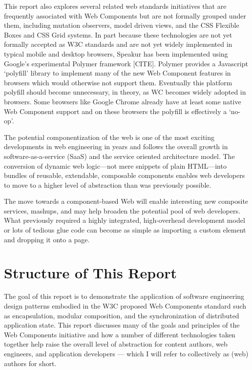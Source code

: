 This report also explores several related web standards initiatives that are frequently associated with Web Components 
but are not formally grouped under them, including mutation observers,
model driven views, 
and the CSS Flexible Boxes
and CSS Grid
systems. 
In part because these technologies are not yet formally accepted as W3C standards and are not yet widely implemented in typical mobile and desktop browsers, 
Speakur has been implemented using Google's experimental Polymer framework [CITE].
Polymer provides a Javascript `polyfill'
library to implement many of the new Web Component features in browsers which would otherwise not support them. 
Eventually this platform polyfill should become unnecessary, in theory, as WC becomes widely adopted in browsers.
Some browsers like Google Chrome already have at least some native Web Component support and on these browsers the polyfill is effectively a `no-op'.

The potential componentization of the web is one of the most exciting developments in web engineering in years and follows the overall growth in software-as-a-service (SaaS) 
and the service oriented architecture
model. 
The conversion of dynamic web logic---not mere snippets of plain HTML---into bundles of reusable, extendable, composable components enables web developers to move to a higher level of abstraction than was previously possible.

The move towards a component-based Web will enable interesting new composite services, mashups, and may help broaden the potential pool of web developers. 
What previously required a highly integrated, high-overhead development model or lots of tedious glue code can become as simple as importing a custom element and dropping it onto a page.


\section{Structure of This Report}
%

The goal of this report is to demonstrate the application of software engineering design patterns embodied in the  W3C proposed Web Components standard such as encapsulation, modular composition, and the synchronization of distributed application state. 
This report discusses many of the goals and principles of the Web Components initiative and how a number of different technologies taken together help raise the overall level of abstraction for content authors, web engineers, and application developers --- which I will refer to collectively as (web) authors for short.

